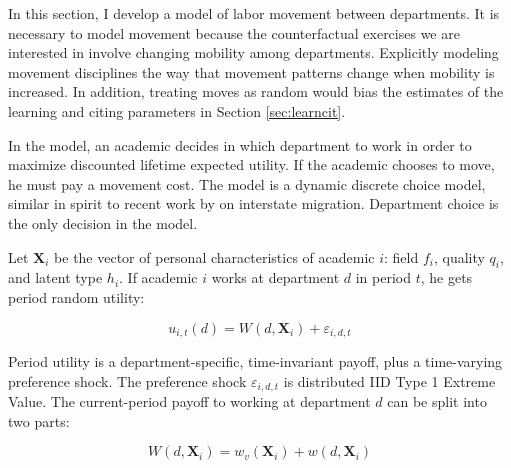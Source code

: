 In this section, I develop a model of labor movement between departments.  It is necessary to model movement because the counterfactual exercises we are interested in involve changing mobility among departments.  Explicitly modeling movement disciplines the way that movement patterns change when mobility is increased.  In addition, treating moves as random would bias the estimates of the learning and citing parameters in Section \ref{sec:learncit}.\footnotemark{}

\setcounter{footnote}{0}

In the model, an academic decides in which department to work in order to
maximize discounted lifetime expected utility. If the academic chooses to move, he must pay a movement cost.  The model is a dynamic discrete choice model, similar in spirit to recent work by \citet{kennan2011effect} on interstate migration.\footnotemark{} Department choice is the only decision in the model.

Let $\mathbf{X}_i$ be the vector of personal characteristics of academic $i$: field $f_i$, quality
$q_i$, and latent type $h_i$. If academic $i$ works at department
$d$ in period $t$, he gets period random utility:

\begin{equation}
    u_{i,t}(d) = W(d, \mathbf{X}_i) + \varepsilon_{i,d,t}
    \label{eq:util}
\end{equation}

Period utility is a department-specific, time-invariant payoff, plus a time-varying preference shock.  The preference shock
 $\varepsilon_{i,d,t}$ is distributed IID Type 1 Extreme Value.
The current-period payoff to working at department $d$ can be split into two parts:

\begin{equation}
    W(d, \mathbf{X}_i) = w_v(\mathbf{X}_i) + w(d, \mathbf{X}_i)
\end{equation}

